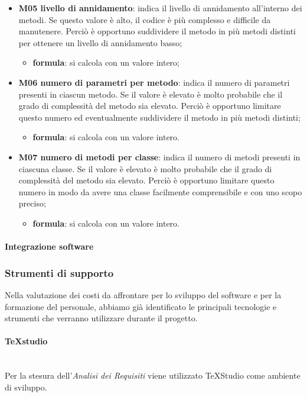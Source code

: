 		\begin{itemize}
			\item \textbf{M05 livello di annidamento}: indica il livello di annidamento all'interno dei metodi. Se questo valore è alto, il codice è più complesso e difficile da manutenere. Perciò è opportuno suddividere il metodo in più metodi distinti per ottenere un livello di annidamento basso;
			\begin{itemize}
				\item[] \textbf{formula}: si calcola con un valore intero;
			\end{itemize}
			\item \textbf{M06 numero di parametri per metodo}: indica il numero di parametri presenti in ciascun metodo. Se il valore è elevato è molto probabile che il grado di complessità del metodo sia elevato. Perciò è opportuno limitare questo numero ed eventualmente suddividere il metodo in più metodi distinti;
			\begin{itemize}
				\item[] \textbf{formula}: si calcola con un valore intero.
			\end{itemize}
			\item \textbf{M07 numero di metodi per classe}: indica il numero di metodi presenti in ciascuna classe. Se il valore è elevato è molto probabile che il grado di complessità del metodo sia elevato. Perciò è opportuno limitare questo numero in modo da avere una classe facilmente comprensibile e con uno scopo preciso;
			\begin{itemize}
				\item[] \textbf{formula}: si calcola con un valore intero.
			\end{itemize}
		\end{itemize}
		\paragraph{Integrazione software}
		\subsubsection{Strumenti di supporto}
		Nella valutazione dei costi da affrontare per lo sviluppo del software e per la formazione del personale, abbiamo già identificato le principali tecnologie e strumenti che verranno utilizzare durante il progetto\glo.
		\paragraph{TeXstudio}\mbox{}\\ [1mm]
		Per la stesura dell'\textit{Analisi dei Requisiti} viene utilizzato TeXStudio come ambiente di sviluppo.
